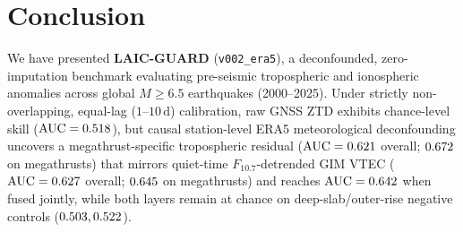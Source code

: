 ﻿\documentclass[journal]{IEEEtran}
\begin{document}
\section{Conclusion}
We have presented \textbf{LAIC-GUARD} (\texttt{v002\_era5}), a deconfounded, zero-imputation benchmark evaluating pre-seismic tropospheric and ionospheric anomalies across \LgTotalGlobalEvents{} global $M \ge 6.5$ earthquakes (2000--2025). Under strictly non-overlapping, equal-lag ($1\text{--}10\,\text{d}$) calibration, raw GNSS ZTD exhibits chance-level skill ($\text{AUC} = 0.518$), but causal station-level ERA5 meteorological deconfounding uncovers a megathrust-specific tropospheric residual ($\text{AUC} = 0.621$ overall; $0.672$ on megathrusts) that mirrors quiet-time $F_{10.7}$-detrended GIM VTEC ($\text{AUC} = 0.627$ overall; $0.645$ on megathrusts) and reaches $\text{AUC} = 0.642$ when fused jointly, while both layers remain at chance on deep-slab/outer-rise negative controls ($0.503, 0.522$).



\end{document}
